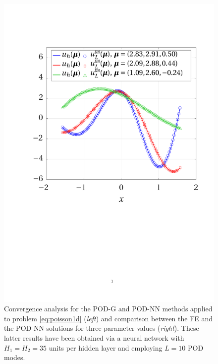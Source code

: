 \documentclass[longtitle]{elsarticle}
\numberwithin{equation}{section}
\theoremstyle{theorem}
\theoremstyle{definition}
\theoremstyle{remark}
\theoremstyle{proposition}
\numberwithin{figure}{section}
\begin{document}
\begin{figure}[b!]
			\includegraphics[scale = 0.385, trim = {1cm 9.5cm 1cm 3.5cm}, clip]{poisson1d_fe_vs_podnn}
			
			\vspace*{-0.2cm}
			
			\caption{Convergence analysis for the POD-G and POD-NN methods applied to problem \eqref{eq:poisson1d} (\emph{left}) and comparison between the FE and the POD-NN solutions for three parameter values (\emph{right}). These latter results have been obtained via a neural network with $H_1 = H_2 = 35$ units per hidden layer and employing $L = 10$ POD modes.}
			\label{fig:poisson1d-fig1}
		\end{figure}
				
\end{document}
